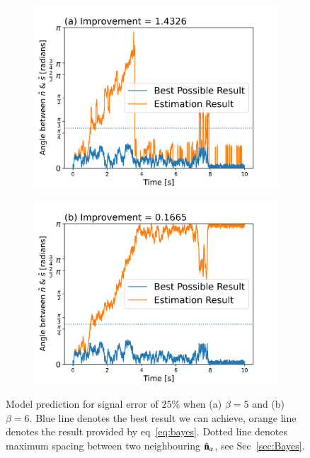 \documentclass[final,  3p]{elsarticle}
\begin{document}
\begin{figure}[h]
	\centering
	\begin{subfigure}{0.33\textwidth}
		\includegraphics[width=\textwidth]{./Images/fig7a.png}
	\end{subfigure}
	\begin{subfigure}{0.33\textwidth}
		\includegraphics[width=\textwidth]{./Images/fig7b.png}
	\end{subfigure}
	\caption{Model prediction for signal error of $25\%$ when (a) $\beta = 5$ and (b) $\beta=6$. Blue line denotes the best result we can achieve, orange line denotes the result provided by eq~\ref{eq:bayes}. Dotted line denotes maximum spacing between two neighbouring $\hat{\bf n}_\alpha$, see Sec~\ref{sec:Bayes}.}
	\label{fig:beta}
\end{figure}
\end{document}
